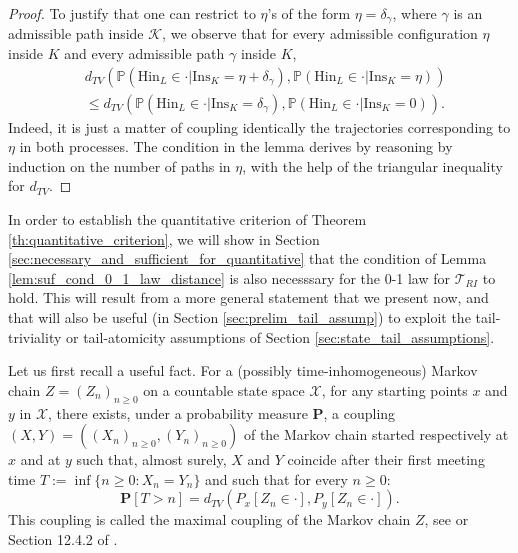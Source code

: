 \documentclass[12pt,a4paper]{article}
\newcommand{\1}[1]{{\mathbf 1}{\{#1\}}}
\newcommand{\K}{{\mathcal K}}
\newcommand{\8}{{\infty}}
\newcommand{\In}{\mathrm{Ins}}
\newcommand{\Hin}{\mathrm{Hin}}
\begin{document}
\begin{proof}
  To justify that one can restrict to $\eta$'s of the form $\eta=\delta_\gamma$, where $\gamma$ is an admissible path inside $\K$, we observe that for every admissible configuration $\eta$ inside $K$ and every admissible path $\gamma$ inside $K$,
\begin{equation}
  \begin{aligned}
  & d_{TV}\left(\mathbb{P}(\Hin_L  \in \cdot | \In_K =\eta+\delta_\gamma),
    \mathbb{P}(\Hin_L  \in \cdot | \In_K =\eta) \right) \\
  & \leq d_{TV}\left(\mathbb{P}(\Hin_L  \in \cdot | \In_K =\delta_\gamma),
    \mathbb{P}(\Hin_L  \in \cdot | \In_K =0) \right) .
  \end{aligned}
\end{equation}
  Indeed, it is just a matter of coupling identically the trajectories corresponding to $\eta$ in both processes. 
  The condition in the lemma derives by reasoning by induction on the number of paths in $\eta$, with the help of the triangular inequality for $d_{TV}$.
\end{proof}

In order to establish the quantitative criterion of Theorem \ref{th:quantitative_criterion}, we will show in Section \ref{sec:necessary_and_sufficient_for_quantitative} that the condition of Lemma \ref{lem:suf_cond_0_1_law_distance} is also necesssary for the 0-1 law for $\mathcal{T}_{RI}$ to hold. This will result from a more general statement that we present now, and that will also be useful (in Section \ref{sec:prelim_tail_assump}) to exploit the tail-triviality or tail-atomicity assumptions of Section \ref{sec:state_tail_assumptions}. 

\smallskip

Let us first recall a useful fact. 
For a (possibly time-inhomogeneous) Markov chain $Z=(Z_n)_{n\ge 0}$ on a countable state space $\mathcal{X}$, 
for any starting points $x$ and $y$ in $\mathcal{X}$, there exists, under a probability measure $\mathbf{P}$, a coupling $(X, Y) = ((X_n)_{n\ge 0} , (Y_n)_{n\ge 0} ) $ of the Markov chain started respectively at $x$ and at $y$ 
such that, almost surely, $X$ and $Y$ coincide after their first meeting time $T:=\inf\{n\ge 0: X_n=Y_n\}$ 
and such that for every $n\ge 0$:
\begin{equation}\label{eq:def_max_coupl}
  \mathbf{P}[T>n]=d_{TV}(P_x[Z_n \in \cdot], P_y[Z_n \in \cdot]).
\end{equation}
This coupling is called the maximal coupling of the Markov chain $Z$, see \cite{Griffeath1975, Pitman1976} or Section 12.4.2 of \cite{Lawler2010}. %
\end{document}
